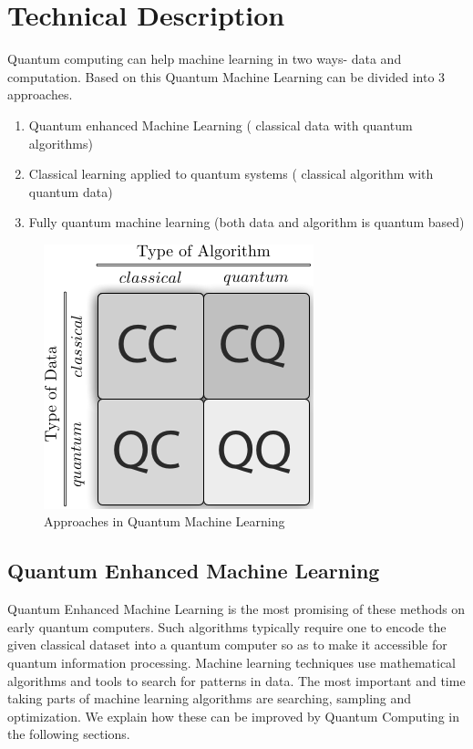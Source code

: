 \chapter{Technical Description}\label{ch:technical_description}
Quantum computing can help machine learning in two ways- data and computation. Based on this Quantum Machine Learning can be divided into 3 approaches.
\begin{enumerate}
\item Quantum enhanced Machine Learning ( classical data with quantum algorithms) 
\item Classical learning applied to quantum systems ( classical algorithm with quantum data)
\item Fully quantum machine learning (both data and algorithm is quantum based)
\end{enumerate}
\begin{figure}[H]
\centering\includegraphics[width=.3\textwidth]{images/approach.png}
\caption{Approaches in Quantum Machine Learning}
\end{figure}
\section{Quantum Enhanced Machine Learning}
Quantum Enhanced Machine Learning is the most promising of these methods on early quantum computers. Such algorithms typically require one to encode the given classical dataset into a quantum computer so as to make it accessible for quantum information processing. Machine learning techniques use mathematical algorithms and tools to search for patterns in data. The most important and time taking parts of machine learning algorithms are searching, sampling and optimization. We explain how these can be improved by Quantum Computing in the following sections.
